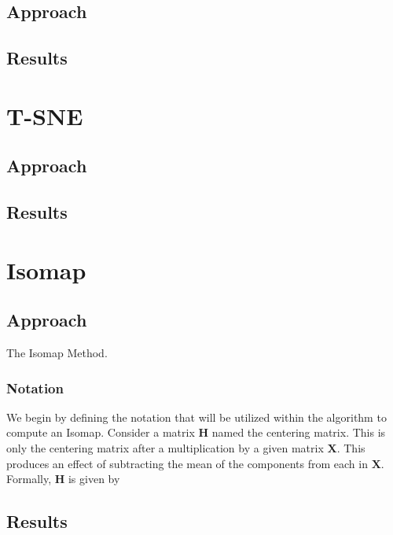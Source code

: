 \documentclass[12pt]{article}
\begin{document}
\subsection{Approach}

\subsection{Results}

\section{T-SNE} \label{sec: T-SNE}
\subsection{Approach}

\subsection{Results}

\section{Isomap} \label{sec: Isomap}
\subsection{Approach}

\hspace{5mm}The Isomap Method.

\subsubsection{Notation}
\hspace{5mm}\text We begin by defining the notation that will be utilized within the algorithm to compute an Isomap. Consider a matrix $\textbf{H}$ named the centering matrix. This is only the centering matrix after a multiplication by a given matrix $\textbf{X}$. This produces an effect of subtracting the mean of the components from each in $\textbf{X}$. Formally, $\textbf{H}$ is given by 



\text{}

\subsection{Results}
\end{document}
